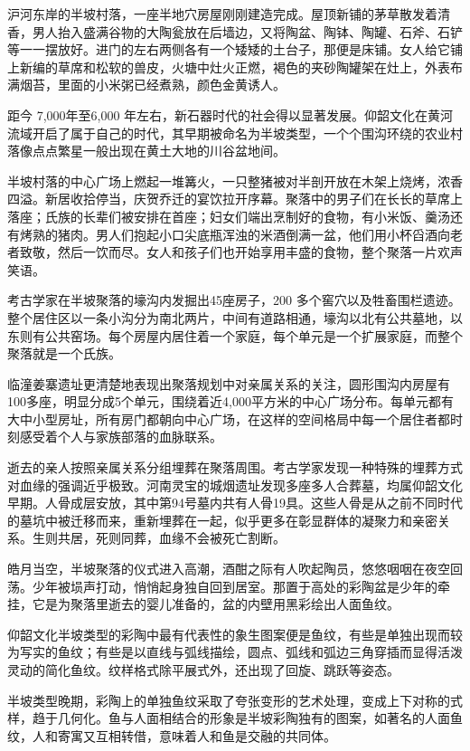 沪河东岸的半坡村落，一座半地穴房屋刚刚建造完成。屋顶新铺的茅草散发着清香，男人抬入盛满谷物的大陶瓮放在后墙边，又将陶盆、陶钵、陶罐、石斧、石铲等一一摆放好。进门的左右两侧各有一个矮矮的土台子，那便是床铺。女人给它铺上新编的草席和松软的兽皮，火塘中灶火正燃，褐色的夹砂陶罐架在灶上，外表布满烟苔，里面的小米粥已经煮熟，颜色金黄诱人。

距今 7,000年至6,000 年左右，新石器时代的社会得以显著发展。仰韶文化在黄河流域开启了属于自己的时代，其早期被命名为半坡类型，一个个围沟环绕的农业村落像点点繁星一般出现在黄土大地的川谷盆地间。

半坡村落的中心广场上燃起一堆篝火，一只整猪被对半剖开放在木架上烧烤，浓香四溢。新居收拾停当，庆贺乔迁的宴饮拉开序幕。聚落中的男子们在长长的草席上落座；氏族的长辈们被安排在首座；妇女们端出烹制好的食物，有小米饭、羹汤还有烤熟的猪肉。男人们抱起小口尖底瓶浑浊的米酒倒满一盆，他们用小杯舀酒向老者致敬，然后一饮而尽。女人和孩子们也开始享用丰盛的食物，整个聚落一片欢声笑语。

考古学家在半坡聚落的壕沟内发掘出45座房子，200 多个窖穴以及牲畜围栏遗迹。整个居住区以一条小沟分为南北两片，中间有道路相通，壕沟以北有公共墓地，以东则有公共窑场。每个房屋内居住着一个家庭，每个单元是一个扩展家庭，而整个聚落就是一个氏族。

临潼姜寨遗址更清楚地表现出聚落规划中对亲属关系的关注，圆形围沟内房屋有100多座，明显分成5个单元，围绕着近4,000平方米的中心广场分布。每单元都有大中小型房址，所有房门都朝向中心广场，在这样的空间格局中每一个居住者都时刻感受着个人与家族部落的血脉联系。

逝去的亲人按照亲属关系分组埋葬在聚落周围。考古学家发现一种特殊的埋葬方式对血缘的强调近乎极致。河南灵宝的城烟遗址发现多座多人合葬墓，均属仰韶文化早期。人骨成层安放，其中第94号墓内共有人骨19具。这些人骨是从之前不同时代的墓坑中被迁移而来，重新埋葬在一起，似乎更多在彰显群体的凝聚力和亲密关系。生则共居，死则同葬，血缘不会被死亡割断。

皓月当空，半坡聚落的仪式进入高潮，酒酣之际有人吹起陶员，悠悠咽咽在夜空回荡。少年被埙声打动，悄悄起身独自回到居室。那置于高处的彩陶盆是少年的牵挂，它是为聚落里逝去的婴儿准备的，盆的内壁用黑彩绘出人面鱼纹。

仰韶文化半坡类型的彩陶中最有代表性的象生图案便是鱼纹，有些是单独出现而较为写实的鱼纹；有些是以直线与弧线描绘，圆点、弧线和弧边三角穿插而显得活泼灵动的简化鱼纹。纹样格式除平展式外，还出现了回旋、跳跃等姿态。

半坡类型晚期，彩陶上的单独鱼纹采取了夸张变形的艺术处理，变成上下对称的式样，趋于几何化。鱼与人面相结合的形象是半坡彩陶独有的图案，如著名的人面鱼纹，人和寄寓又互相转借，意味着人和鱼是交融的共同体。

